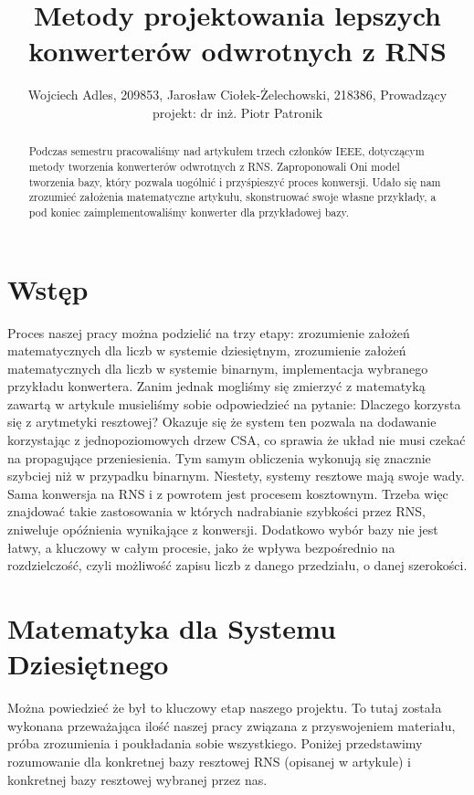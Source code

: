 \documentclass[comsoc]{IEEEtran}
\begin{document}
	\title{Metody projektowania lepszych konwerterów odwrotnych z RNS}
	\author{Wojciech Adles, 209853, Jarosław Ciołek-Żelechowski, 218386, Prowadzący projekt: dr inż. Piotr Patronik}
	\maketitle
	
	
	\begin{abstract}
	Podczas semestru pracowaliśmy nad artykułem trzech członków IEEE, dotyczącym metody tworzenia konwerterów odwrotnych z RNS. Zaproponowali Oni model tworzenia bazy, który pozwala uogólnić i przyśpieszyć proces konwersji. Udało się nam zrozumieć założenia matematyczne artykułu, skonstruować swoje własne przykłady, a pod koniec zaimplementowaliśmy konwerter dla przykładowej bazy.
	\end{abstract}
	
	\section{Wstęp}
	Proces naszej pracy można podzielić na trzy etapy: zrozumienie założeń matematycznych dla liczb w systemie dziesiętnym, zrozumienie założeń matematycznych dla liczb w systemie binarnym, implementacja wybranego przykładu konwertera. Zanim jednak mogliśmy się zmierzyć z matematyką zawartą w artykule musieliśmy sobie odpowiedzieć na pytanie: Dlaczego korzysta się z arytmetyki resztowej? Okazuje się że system ten pozwala na dodawanie korzystając z jednopoziomowych drzew CSA, co sprawia że układ nie musi czekać na propagujące przeniesienia. Tym samym obliczenia wykonują się znacznie szybciej niż w przypadku binarnym. Niestety, systemy resztowe mają swoje wady. Sama konwersja na RNS i z powrotem jest procesem kosztownym. Trzeba więc znajdować takie zastosowania w których nadrabianie szybkości przez RNS, zniweluje opóźnienia wynikające z konwersji. Dodatkowo wybór bazy nie jest łatwy, a kluczowy w całym procesie, jako że wpływa bezpośrednio na rozdzielczość, czyli możliwość zapisu liczb z danego przedziału, o danej szerokości.
	
	\section{Matematyka dla Systemu Dziesiętnego}
	Można powiedzieć że był to kluczowy etap naszego projektu. To tutaj została wykonana przeważająca ilość naszej pracy związana z przyswojeniem materiału, próba zrozumienia i poukładania sobie wszystkiego. Poniżej przedstawimy rozumowanie dla konkretnej bazy resztowej RNS (opisanej w artykule) i konkretnej bazy resztowej wybranej przez nas.
	
\end{document}
